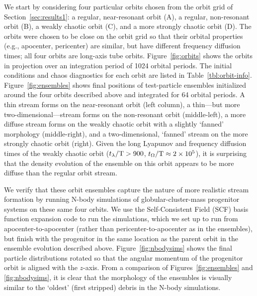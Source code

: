\documentclass[letterpaper,12pt,preprint]{aastex}
\newcommand{\periods}{\ensuremath{{\rm T}}}
\newcommand{\chchchanges}[1]{{\color{red} {#1}}}
\begin{document}
We start by considering four particular orbits chosen from the orbit grid of Section~\ref{sec:results1}: a regular, near-resonant orbit (A), a regular, non-resonant orbit (B), a weakly chaotic orbit (C), and a \chchchanges{more} strongly chaotic orbit (D). The orbits were chosen to be close on the orbit grid so that their orbital properties (e.g., apocenter, pericenter) are similar, but have different frequency diffusion times; all four orbits are long-axis tube orbits. Figure~\ref{fig:orbits} shows the orbits in projection over \chchchanges{an integration period of 1024 orbital periods}. The initial conditions and chaos diagnostics for each orbit are listed in Table~\ref{tbl:orbit-info}. Figure~\ref{fig:ensembles} shows final positions of test-particle ensembles initialized around the four orbits described above and \chchchanges{integrated} for 64 orbital periods. A thin stream forms on the near-resonant orbit (left column), a thin---but more two-dimensional---stream forms on the non-resonant orbit (middle-left), a more diffuse stream forms on the weakly chaotic orbit with a slightly `fanned' morphology (middle-right), and a two-dimensional, `fanned' stream on the \chchchanges{more} strongly chaotic orbit (right). Given the long Lyapunov and frequency diffusion times of the weakly chaotic orbit ($t_\lambda/\periods > 900$, $t_\Omega/\periods \approx 2\times10^5$), it is surprising that the density evolution of the ensemble on this orbit appears to be more diffuse than the regular orbit stream. 

We verify that these orbit ensembles capture the nature of more realistic stream formation by running N-body simulations of globular-cluster-mass progenitor systems on these same four orbits. We use the Self-Consistent Field (SCF) basis function expansion code \citep{hernquist92} to run the simulations, which we set up to run from apocenter-to-apocenter (rather than pericenter-to-apocenter as in the ensembles), but finish with the progenitor in the same location as the parent orbit in the ensemble evolution described above. Figure~\ref{fig:nbodysims} shows the final particle distributions rotated so that the angular momentum of the progenitor orbit is aligned with the $z$-axis. From a comparison of Figures~\ref{fig:ensembles} and \ref{fig:nbodysims}, it is clear that the morphology of the ensembles is visually similar to the `oldest' (first stripped) debris in the N-body simulations.
\end{document}
